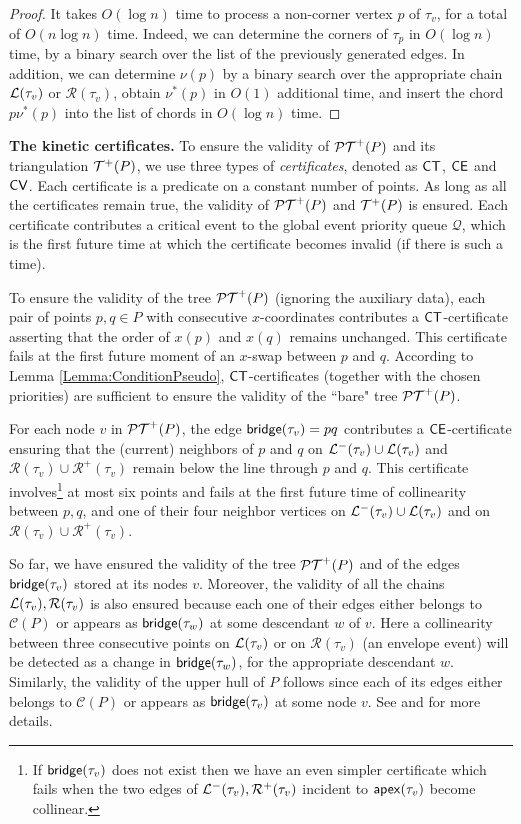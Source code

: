 \documentclass[11pt]{article}
\def\bridge{{\sf bridge}}
\def\PT{{\cal PT}}
\def\CT{{\sf CT}}
\def\CV{{\sf CV}}
\def\CE{{\sf CE}}
\def\T{{\cal T}}
\def\C{\mathcal{C}}
\def\Q{\mathcal{Q}}
\def\L{{\cal L}}
\def\R{\mathcal{R}}
\def\apex{{\sf apex}}
\begin{document}
\begin{proof}
  It takes $O(\log n)$ time to process a non-corner vertex $p$ of
  $\tau_v$, for a total of $O(n\log n)$ time. Indeed, we can determine the
  corners of $\tau_p$ in $O(\log n)$ time, by a binary search over the
  list of the previously generated edges. In addition, we can
  determine $\nu(p)$ by a binary search over the appropriate chain
  $\L(\tau_v)$ or $\R(\tau_v)$, obtain $\nu^*(p)$ in $O(1)$ additional time, and insert the chord $p\nu^*(p)$ into the list of chords in $O(\log n)$ time.
\end{proof}


\medskip
\noindent
{\bf The kinetic certificates.}
To ensure the validity of $\PT^+(P)$ and its triangulation $\T^+(P)$,
we use three types of \textit{certificates}, denoted as $\CT$, $\CE$ and
$\CV$. Each certificate is a  predicate on  a constant number of
points.  As long as all the certificates remain true, the validity of
$\PT^+(P)$ and $\T^+(P)$ is ensured.  Each certificate contributes a
critical event to the global event priority queue $\Q$, which is the first
future time at which the certificate becomes invalid (if there is such a
time).

\smallskip
\noindent {\bf \emph{$\CT$-certificates}.} To ensure the validity of the tree
$\PT^+(P)$ (ignoring the auxiliary data), each pair of points $p,q\in
P$ with consecutive $x$-coordinates contributes a $\CT$-certificate
asserting that the order of $x(p)$ and $x(q)$ remains unchanged.
This certificate fails at the first future moment of an $x$-swap between $p$ and $q$.
According to Lemma \ref{Lemma:ConditionPseudo}, $\CT$-certificates (together with the chosen priorities) are
sufficient to ensure the validity of the ``bare" tree $\PT^+(P)$.

\smallskip
\noindent {\bf \emph{$\CE$-certificates}.} 
For each node $v$ in $\PT^+(P)$, the edge $\bridge(\tau_v)=pq$  contributes a
$\CE$-certificate ensuring that the (current) neighbors of $p$ and $q$
on $\L^-(\tau_v)\cup \L(\tau_v)$ and $\R(\tau_v)\cup \R^+(\tau_v)$
remain below the line through $p$ and $q$.  This certificate
involves\footnote{\small If $\bridge(\tau_v)$ does not exist then we have an
  even simpler certificate which fails when the two edges of
  $\L^-(\tau_v),\R^+(\tau_v)$ incident to $\apex(\tau_v)$ become
  collinear.} at most six points and fails at the first future time of
collinearity between $p,q$, and one of their four neighbor vertices on
$\L^-(\tau_v)\cup \L(\tau_v)$ and on $\R(\tau_v)\cup \R^+(\tau_v)$.

So far, we have ensured the validity of the tree $\PT^+(P)$ and of the edges $\bridge(\tau_v)$ stored at its nodes $v$. Moreover, the validity of all the chains $\L(\tau_v),\R(\tau_v)$ is also ensured because each one of their edges either belongs to $\C(P)$ or appears as $\bridge(\tau_w)$ at some descendant $w$ of $v$. Here a collinearity between three consecutive points on $\L(\tau_v)$ or on $\R(\tau_v)$ (an envelope event) will be detected as a change in $\bridge(\tau_w)$, for the appropriate descendant $w$. 
Similarly, the validity of the upper hull of $P$ follows since each of its edges either belongs to $\C(P)$ or appears as $\bridge(\tau_v)$ at some node $v$.
See \cite{AKS} and \cite{Overmars} for more details.
\end{document}
